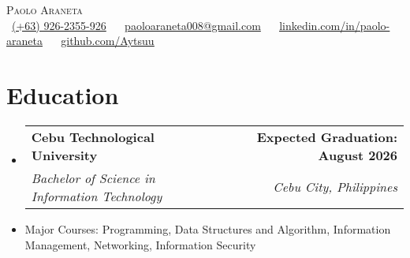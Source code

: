 \documentclass[letterpaper,11pt]{article}
\makeatletter
\newcommand{\resumeItem}[1]{
  \item\small{
    {#1 \vspace{0pt}}
  }
}
\newcommand{\resumeSubheading}[4]{
  \vspace{-2pt}\item
    \begin{tabular*}{1.0\textwidth}[t]{l@{\extracolsep{\fill}}r}
      \textbf{#1} & \textbf{\small #2} \\
      \textit{\small#3} & \textit{\small #4} \\
    \end{tabular*}\vspace{-7pt}
}
\newcommand{\resumeSubHeadingListStart}{\begin{itemize}[leftmargin=0.0in, label={}]}
\newcommand{\resumeSubHeadingListEnd}{\end{itemize}}\vspace{0pt}
\newcommand{\resumeItemListStart}{\begin{itemize}}
\newcommand{\resumeItemListEnd}{\end{itemize}\vspace{-5pt}}
\makeatother
\begin{document}
\begin{center}
    {\Large \scshape Paolo Araneta} \\[2mm]
    \footnotesize \raisebox{-0.1\height}
    \faPhone\ \underline{(+63) 926-2355-926} ~ 
    {\faEnvelope\  \underline{paoloaraneta008@gmail.com}} ~ 
    {\faLinkedin\ \underline{\href{https://www.linkedin.com/in/paolo-araneta-65b332336/}{linkedin.com/in/paolo-araneta}}} ~
    {\faGithub\ \underline{\href{https://github.com/Aytsuu}{github.com/Aytsuu}}} ~
\end{center}

\section{Education}
  \resumeSubHeadingListStart
    \resumeSubheading
      {Cebu Technological University}{Expected Graduation: August 2026}
      {Bachelor of Science in Information Technology
      }{Cebu City, Philippines}
  \resumeSubHeadingListEnd
    \resumeItemListStart
        \vspace{-7pt}
        \resumeItem {Major Courses: Programming, Data Structures and Algorithm, Information Management, Networking, Information Security}
    \resumeItemListEnd
    \vspace{-12pt}
\end{document}
